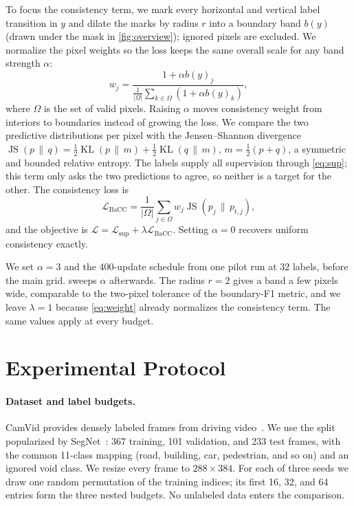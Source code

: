 \documentclass[runningheads]{llncs}
\begin{document}
To focus the consistency term, we mark every horizontal and vertical label
transition in $y$ and dilate the marks by radius $r$ into a boundary band
$b(y)$ (drawn under the mask in \cref{fig:overview}); ignored pixels are
excluded. We normalize the pixel weights so the loss keeps the same overall scale for
any band strength $\alpha$:
\begin{equation}
w_j = \frac{1+\alpha b(y)_j}
{\frac{1}{|\Omega|}\sum_{k\in\Omega}(1+\alpha b(y)_k)},
\label{eq:weight}
\end{equation}
where $\Omega$ is the set of valid pixels. Raising $\alpha$ moves consistency
weight from interiors to boundaries instead of growing the loss. We compare the two predictive distributions per pixel with the
Jensen--Shannon divergence
$\operatorname{JS}(p\,\|\,q)=\tfrac{1}{2}\operatorname{KL}(p\,\|\,m)
+\tfrac{1}{2}\operatorname{KL}(q\,\|\,m)$, $m=\tfrac{1}{2}(p+q)$, a symmetric
and bounded relative entropy. The labels supply all supervision through
\cref{eq:sup}; this term only asks the two predictions to agree, so neither is
a target for the other. The consistency loss is
\begin{equation}
\mathcal{L}_{\mathrm{BaCC}} = \frac{1}{|\Omega|}\sum_{j\in\Omega}
w_j\operatorname{JS}(p_j\,\|\,p_{t,j}),
\label{eq:bacc}
\end{equation}
and the objective is
$\mathcal{L}=\mathcal{L}_{\mathrm{sup}}+\lambda\mathcal{L}_{\mathrm{BaCC}}$.
Setting $\alpha=0$ recovers uniform consistency exactly.

We set $\alpha=3$ and the 400-update schedule from one pilot run at 32 labels,
before the main grid.  sweeps $\alpha$ afterwards. The
radius $r=2$ gives a band a few pixels wide, comparable to the two-pixel
tolerance of the boundary-F1 metric, and we leave $\lambda=1$ because
\cref{eq:weight} already normalizes the consistency term. The same values apply
at every budget.

\section{Experimental Protocol}
\label{sec:protocol}

\paragraph{Dataset and label budgets.}
CamVid provides densely labeled frames from driving
video~\cite{brostow2009camvid}. We use the split popularized by
SegNet~\cite{badrinarayanan2017segnet}: 367 training, 101 validation, and 233
test frames, with the common 11-class mapping (road, building, car,
pedestrian, and so on) and an ignored void class. We resize every frame to
$288\times384$. For each of three seeds we draw one random
permutation of the training indices; its first 16, 32, and 64 entries form the
three nested budgets. No unlabeled data enters the comparison.
\end{document}
